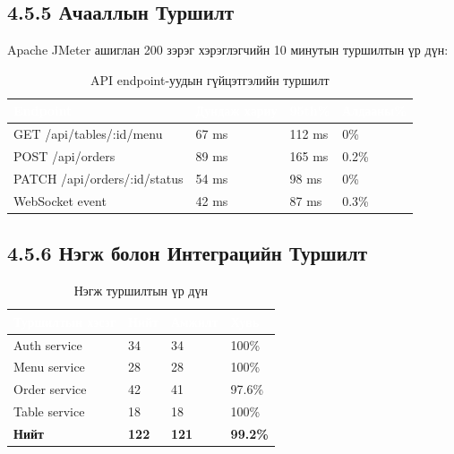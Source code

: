 \subsection{4.5.5 Ачааллын Туршилт}

Apache JMeter ашиглан 200 зэрэг хэрэглэгчийн 10 минутын туршилтын үр дүн:

\begin{table}[htbp]
\caption{API endpoint-уудын гүйцэтгэлийн туршилт}
\label{tab:loadtest}
\centering
\begin{tabularx}{\textwidth}{|X|Z|Z|Z|}
\hline
{}\textcolor{white}{\textbf{Endpoint}}
  & \textcolor{white}{\textbf{Дундаж хариу}}
  & \textcolor{white}{\textbf{95th\%}}
  & \textcolor{white}{\textbf{Алдааны\%}} \\ \hline
GET /api/tables/:id/menu   & 67 ms  & 112 ms & 0\%   \\ \hline
POST /api/orders           & 89 ms  & 165 ms & 0.2\% \\ \hline
PATCH /api/orders/:id/status & 54 ms & 98 ms & 0\%  \\ \hline
WebSocket event            & 42 ms  & 87 ms  & 0.3\% \\ \hline
\end{tabularx}
\end{table}

\subsection{4.5.6 Нэгж болон Интеграцийн Туршилт}

\begin{table}[htbp]
\caption{Нэгж туршилтын үр дүн}
\label{tab:unittest}
\centering
\begin{tabularx}{0.85\textwidth}{|X|Z|Z|Z|}
\hline
{}\textcolor{white}{\textbf{Туршилтын хэсэг}}
  & \textcolor{white}{\textbf{Нийт}}
  & \textcolor{white}{\textbf{Амжилт}}
  & \textcolor{white}{\textbf{Хувь}} \\ \hline
Auth service     & 34  & 34  & 100\% \\ \hline
Menu service     & 28  & 28  & 100\% \\ \hline
Order service    & 42  & 41  & 97.6\% \\ \hline
Table service    & 18  & 18  & 100\% \\ \hline
{}\textbf{Нийт} & \textbf{122} & \textbf{121} & \textbf{99.2\%} \\ \hline
\end{tabularx}
\end{table}

